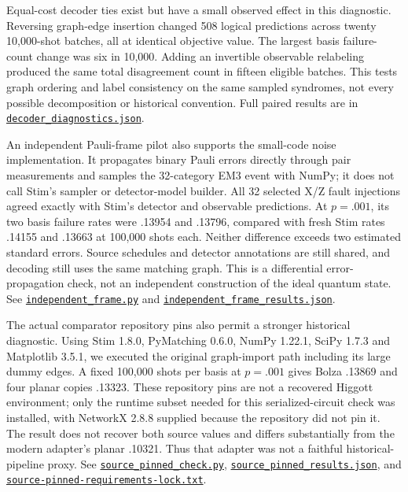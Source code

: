 \documentclass[11pt]{article}
\newcommand{\file}[2]{\href{https://github.com/alectionary/vibe-math/blob/master/formalization/higgott-quantum-decoding/#1}{\nolinkurl{#2}}}
\begin{document}
Equal-cost decoder ties exist but have a small observed effect in this diagnostic. Reversing graph-edge insertion changed 508 logical predictions across twenty 10,000-shot batches, all at identical objective value. The largest basis failure-count change was six in 10,000. Adding an invertible observable relabeling produced the same total disagreement count in fifteen eligible batches. This tests graph ordering and label consistency on the same sampled syndromes, not every possible decomposition or historical convention. Full paired results are in \file{revision2/decoder_diagnostics.json}{decoder_diagnostics.json}.

An independent Pauli-frame pilot also supports the small-code noise implementation. It propagates binary Pauli errors directly through pair measurements and samples the 32-category EM3 event with NumPy; it does not call Stim's sampler or detector-model builder. All 32 selected X/Z fault injections agreed exactly with Stim's detector and observable predictions. At $p=.001$, its two basis failure rates were .13954 and .13796, compared with fresh Stim rates .14155 and .13663 at 100,000 shots each. Neither difference exceeds two estimated standard errors. Source schedules and detector annotations are still shared, and decoding still uses the same matching graph. This is a differential error-propagation check, not an independent construction of the ideal quantum state. See \file{revision2/independent_frame.py}{independent_frame.py} and \file{revision2/independent_frame_results.json}{independent_frame_results.json}.

The actual comparator repository pins also permit a stronger historical diagnostic. Using Stim 1.8.0, PyMatching 0.6.0, NumPy 1.22.1, SciPy 1.7.3 and Matplotlib 3.5.1, we executed the original graph-import path including its large dummy edges. A fixed 100,000 shots per basis at $p=.001$ gives Bolza .13869 and four planar copies .13323. These repository pins are not a recovered Higgott environment; only the runtime subset needed for this serialized-circuit check was installed, with NetworkX 2.8.8 supplied because the repository did not pin it. The result does not recover both source values and differs substantially from the modern adapter's planar .10321. Thus that adapter was not a faithful historical-pipeline proxy. See \file{revision2/source_pinned_check.py}{source_pinned_check.py}, \file{revision2/source_pinned_results.json}{source_pinned_results.json}, and \file{revision2/source-pinned-requirements-lock.txt}{source-pinned-requirements-lock.txt}.
\end{document}
